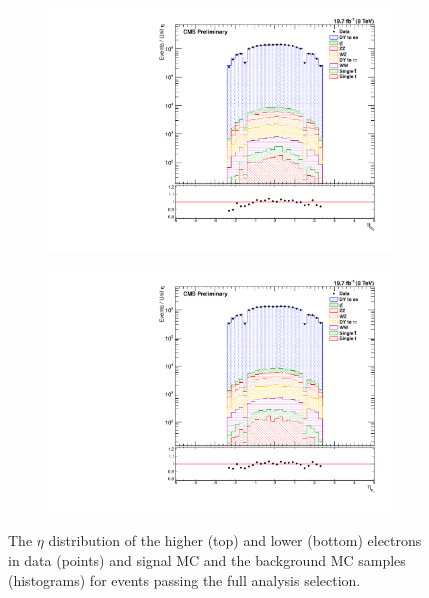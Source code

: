 \begin{figure}[!htbp]
    \vspace*{\fill}
    \centering
    \begin{subfigure}[b]{0.65\textwidth}
        \includegraphics[width=\textwidth]{figures/e0_eta.pdf}
    \end{subfigure}
    \begin{subfigure}[b]{0.65\textwidth}
        \includegraphics[width=\textwidth]{figures/e1_eta.pdf}
    \end{subfigure}
    \caption[
        The $\eta$ distribution of electrons in data.
    ]{
        The $\eta$ distribution of the higher (top) and lower (bottom) \pt
        electrons in data (points) and \MADGRAPH signal MC and the background
        MC samples (histograms) for events passing the full analysis selection.
    }
    \label{fig:e_eta}
\end{figure}

